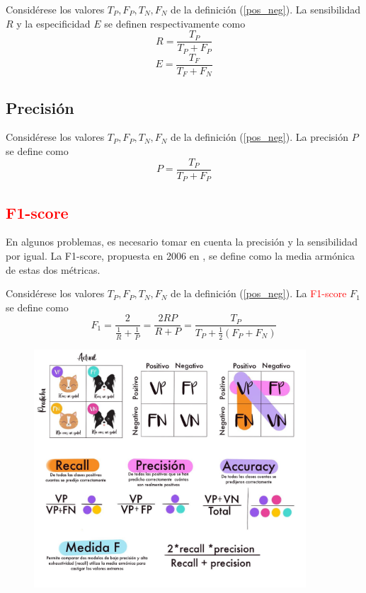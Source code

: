 \begin{definition}
    Considérese los valores $T_P, F_P, T_N, F_N$ de la definición (\ref{pos_neg}). La sensibilidad $R$ y la especificidad $E$ se definen respectivamente como 
    \begin{equation}
        R = \frac{T_P}{T_P + F_P}
    \end{equation}
    \begin{equation}
        E = \frac{T_F}{T_F + F_N}
    \end{equation}
\end{definition}
\subsection{Precisión}
\begin{definition}[Precisión]
    Considérese los valores $T_P, F_P, T_N, F_N$ de la definición (\ref{pos_neg}). La precisión $P$ se define como 
    \begin{equation}
        P = \frac{T_P}{T_P + F_P}
    \end{equation}
\end{definition}
\subsection{\textcolor{red}{F1-score}}
En algunos problemas, es necesario tomar en cuenta la precisión y la sensibilidad por igual. La F1-score, propuesta en 2006 en \cite{f1score}, se define como la media armónica de estas dos métricas. 
\begin{definition}[\textcolor{red}{F1-score}]
    Considérese los valores $T_P, F_P, T_N, F_N$ de la definición (\ref{pos_neg}). La \textcolor{red}{F1-score} $F_1$ se define como 
    \begin{equation}
        F_1  = \frac{2}{\frac{1}{R} + \frac{1}{P}} = \frac{2RP}{R + P} = \frac{T_P}{T_P + \frac{1}{2}(F_P + F_N)}
    \end{equation}
\end{definition}
\begin{figure}[H]
    \centering
    \includegraphics[width=4in]{../cap5_experimentos/src/metricas.jpeg}
\end{figure}
